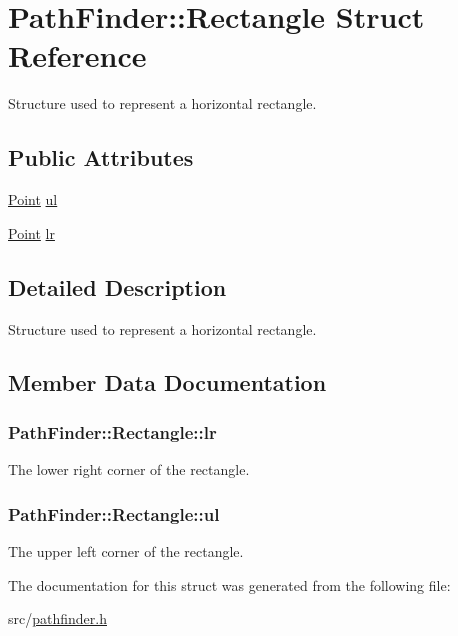 \hypertarget{structPathFinder_1_1Rectangle}{
\section{PathFinder::Rectangle Struct Reference}
\label{structPathFinder_1_1Rectangle}
}


Structure used to represent a horizontal rectangle.  


\subsection*{Public Attributes}
\begin{DoxyCompactItemize}
\item 
\hyperlink{structPathFinder_1_1Point}{Point} \hyperlink{structPathFinder_1_1Rectangle_a9702d191b5627d0588f4053ac671aecf}{ul}
\item 
\hyperlink{structPathFinder_1_1Point}{Point} \hyperlink{structPathFinder_1_1Rectangle_adec50e08ca85bd83d626ab4ccefd3258}{lr}
\end{DoxyCompactItemize}


\subsection{Detailed Description}
Structure used to represent a horizontal rectangle. 

\subsection{Member Data Documentation}
\hypertarget{structPathFinder_1_1Rectangle_adec50e08ca85bd83d626ab4ccefd3258}{
\subsubsection[{lr}]{ {\bf PathFinder::Rectangle::lr}}}
\label{structPathFinder_1_1Rectangle_adec50e08ca85bd83d626ab4ccefd3258}
The lower right corner of the rectangle. \hypertarget{structPathFinder_1_1Rectangle_a9702d191b5627d0588f4053ac671aecf}{
\subsubsection[{ul}]{ {\bf PathFinder::Rectangle::ul}}}
\label{structPathFinder_1_1Rectangle_a9702d191b5627d0588f4053ac671aecf}
The upper left corner of the rectangle. 

The documentation for this struct was generated from the following file:\begin{DoxyCompactItemize}
\item 
src/\hyperlink{pathfinder_8h}{pathfinder.h}\end{DoxyCompactItemize}
